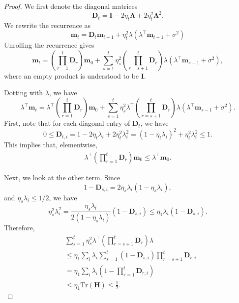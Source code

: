 \documentclass[10pt,a4paper]{amsart}
\def\D{{\mathbf{D}}}
\def\H{{\mathbf{H}}}
\def\I{{\mathbf{I}}}
\def\LLambda{{\mathbf{\Lambda}}}
\def\m{{\mathbf{m}}}
\def\tr{\text{Tr}}
\begin{document}
\begin{proof}
    We first denote the diagonal matrices
    \[
    \D_t
    =
    \I
    - 2 \eta_t \LLambda
    + 2 \eta_t^2 \LLambda^2.
    \]
    We rewrite the recurrence as
    \[
    \m_t
    =
    \D_t \m_{t-1}
    + \eta_t^2 \lambda
    (\lambda^\top \m_{t-1} + \sigma^2)
    \]
    Unrolling the recurrence gives
    \[
    \m_t
    =
    \left(\prod_{r=1}^t \D_r\right)\m_0
    +
    \sum_{s=1}^t
    \eta_s^2
    \left(\prod_{r=s+1}^t \D_r\right)
    \lambda
    (\lambda^\top \m_{s-1} + \sigma^2),
    \]
    where an empty product is understood to be $\I$.

    Dotting with $\lambda$, we have
    \[
    \lambda^\top \m_t
    =
    \lambda^\top
    \left(\prod_{r=1}^t \D_r\right)\m_0
    +
    \sum_{s=1}^t
    \eta_s^2
    \lambda^\top
    \left(\prod_{r=s+1}^t \D_r\right)
    \lambda
    (\lambda^\top \m_{s-1} + \sigma^2).
    \]
    First, note that for each diagonal entry of $\D_t$, we have
    \[
    0
    \leq
    \D_{t,i}
    =
    1 - 2\eta_t\lambda_i + 2\eta_t^2\lambda_i^2
    =
    (1-\eta_t\lambda_i)^2 + \eta_t^2\lambda_i^2
    \leq 1.
    \]
    This implies that, elementwise,
    \begin{align}
        \label{eqn:first_thing}
        \lambda^\top
        \left(\prod_{r=1}^t \D_r\right)\m_0
        \leq
        \lambda^\top \m_0.
    \end{align}

    Next, we look at the other term. Since
    \[
    1-\D_{s,i}
    =
    2\eta_s\lambda_i(1-\eta_s\lambda_i),
    \]
    and $\eta_s\lambda_i\leq 1/2$, we have
    \[
    \eta_s^2\lambda_i^2
    =
    \frac{\eta_s\lambda_i}
         {2(1-\eta_s\lambda_i)}
    (1-\D_{s,i})
    \leq
    \eta_1\lambda_i(1-\D_{s,i}).
    \]
    Therefore,
    \begin{align}
        \label{eqn:second_thing}
        &
        \sum_{s=1}^t
        \eta_s^2
        \lambda^\top
        \left(\prod_{r=s+1}^t \D_r\right)
        \lambda
        \nonumber\\
        &\leq
        \eta_1
        \sum_i \lambda_i
        \sum_{s=1}^t
        (1-\D_{s,i})
        \prod_{r=s+1}^t \D_{r,i}
        \nonumber\\
        &=
        \eta_1
        \sum_i \lambda_i
        \left(
            1-\prod_{r=1}^t \D_{r,i}
        \right)\\
        &\leq
        \eta_1 \tr(\H)
        \leq
        \frac{1}{2}.
    \end{align}


\end{proof}
\end{document}
